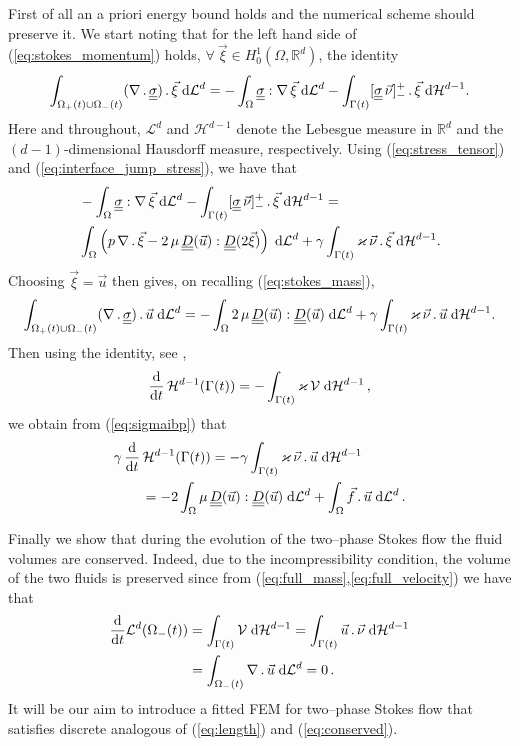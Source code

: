 \documentclass[a4paper,12pt,onecolumn]{article}
\newcommand{\R}{{\mathbb R}}
\newcommand{\vol}{\mathcal{L}^d} %
\newcommand{\dH}[1]{\;{\rm d}{\cal H}^{#1}} %
\newcommand{\dL}[1]{\;{\rm d}{\cal L}^{#1}} %
\newcommand{\ddt}{\frac{\rm d}{{\rm d}t}}
\newcommand{\mat}[1]{\underline{\underline{#1}}\rule{0pt}{0pt}}
\begin{document}
First of all an a priori energy bound holds and the numerical scheme should preserve it. We start noting that for the left hand side of (\ref{eq:stokes_momentum}) holds, $\forall \ \vec \xi \in H^1_0(\Omega, \R^d)$, the identity 
\begin{equation}\label{eq:weak_stress_tensor}
\int_{\Omega_+(t)\cup\Omega_-(t)} (\nabla\,.\,\mat\sigma)\,.\, \vec \xi \dL{d}  = - \int_{\Omega} \mat\sigma : \nabla\,\vec \xi \dL{d}
- \int_{\Gamma(t)} [\mat\sigma\,\vec\nu]_-^+\, . \,\vec \xi  \dH{d-1}.
\end{equation}
Here and throughout, $\mathcal{L}^d$ and $\mathcal{H}^{d-1}$ denote the Lebesgue measure in $\R^d$ and the $(d-1)$-dimensional Hausdorff measure, respectively. Using (\ref{eq:stress_tensor}) and (\ref{eq:interface_jump_stress}), we have that
\begin{align}
& - \int_{\Omega} \mat\sigma : \nabla\,\vec \xi \dL{d} - \int_{\Gamma(t)} [\mat\sigma\,\vec\nu]_-^+\, . \,\vec \xi  \dH{d-1} = \nonumber\\
&\int_{\Omega} \left( p\,\nabla\,.\,\vec \xi -2\,\mu\,\mat D(\vec u) : \mat D(2\vec \xi) \right) \dL{d} + \gamma \int_{\Gamma(t)} \varkappa\,\vec \nu \,.\, \vec \xi \dH{d-1}.
\end{align}
Choosing $\vec \xi=\vec u$ then gives, on recalling (\ref{eq:stokes_mass}),
\begin{equation}\label{eq:sigmaibp}
\int_{\Omega_+(t)\cup\Omega_-(t)} (\nabla\,.\,\mat\sigma)\,.\, \vec u \dL{d} = -\int_{\Omega} 2\,\mu\,\mat D(\vec u) : \mat D(\vec u) \dL{d} + \gamma \int_{\Gamma(t)} \varkappa\,\vec \nu \,.\, \vec u \dH{d-1}.
\end{equation}
 Then using the identity, see \cite[Lemma~2.1]{DeckelnickDE05}, 
\begin{equation}
\ddt\,\mathcal{H}^{d-1}(\Gamma(t)) = -\int_{\Gamma(t)} \varkappa\,\mathcal{V} \dH{d-1} \,,
\label{eq:dtarea}
\end{equation}
we obtain from (\ref{eq:sigmaibp}) that
\begin{align}
& \gamma\,\ddt\,\mathcal{H}^{d-1}(\Gamma(t)) = -\gamma \int_{\Gamma(t)} \varkappa\,\vec \nu \,.\,\vec u \dH{d-1} \nonumber\\
& \qquad =-2\int_\Omega\mu\, \mat D(\vec u):\mat D(\vec u) \dL{d} +\int_\Omega \vec f\,.\, \vec u \dL{d}\,.\label{eq:length}
\end{align}

Finally we show that during the evolution of the two--phase Stokes flow the fluid volumes are conserved. Indeed, due to the incompressibility condition, the volume of the two fluids is preserved since from (\ref{eq:full_mass},\ref{eq:full_velocity}) we have that
\begin{align}
\frac{\rm d}{{\rm d}t} \vol(\Omega_-(t)) & = \int_{\Gamma(t)} \mathcal{V}\dH{d-1}=\int_{\Gamma(t)}\vec u\,.\,\vec\nu \dH{d-1} \nonumber \\ 
& = \int_{\Omega_-(t)} \nabla\,.\,\vec u \dL{d} =0\,. \label{eq:conserved}
\end{align}
It will be our aim to introduce a fitted FEM for two--phase Stokes flow that satisfies discrete analogous of (\ref{eq:length}) and (\ref{eq:conserved}).
\end{document}
